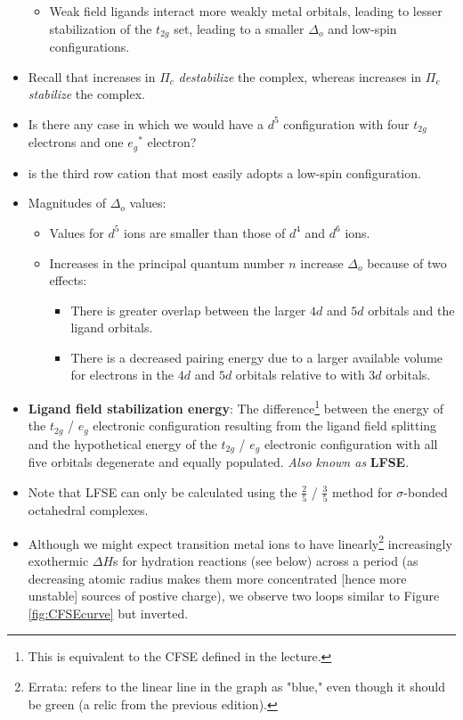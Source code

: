 \documentclass[../notes.tex]{subfiles}
\begin{document}
\begin{itemize}
    \begin{itemize}
        \item Weak field ligands interact more weakly metal orbitals, leading to lesser stabilization of the $t_{2g}$ set, leading to a smaller $\Delta_o$ and low-spin configurations.
    \end{itemize}
    \item Recall that increases in $\Pi_c$ \emph{destabilize} the complex, whereas increases in $\Pi_e$ \emph{stabilize} the complex.
    \item Is there any case in which we would have a $d^5$ configuration with four $t_{2g}$ electrons and one ${e_g}^*$ electron?
    \item {} is the third row cation that most easily adopts a low-spin configuration.
    \item Magnitudes of $\Delta_o$ values:
    \begin{itemize}
        \item Values for $d^5$ ions are smaller than those of $d^4$ and $d^6$ ions.
        \item Increases in the principal quantum number $n$ increase $\Delta_o$ because of two effects:
        \begin{itemize}
            \item There is greater overlap between the larger $4d$ and $5d$ orbitals and the ligand orbitals.
            \item There is a decreased pairing energy due to a larger available volume for electrons in the $4d$ and $5d$ orbitals relative to with $3d$ orbitals.
        \end{itemize}
    \end{itemize}
    \item \textbf{Ligand field stabilization energy}: The difference\footnote{This is equivalent to the CFSE defined in the lecture.} between the energy of the $t_{2g}$ / $e_g$ electronic configuration resulting from the ligand field splitting and the hypothetical energy of the $t_{2g}$ / $e_g$ electronic configuration with all five orbitals degenerate and equally populated. \emph{Also known as} \textbf{LFSE}.
    \item Note that LFSE can only be calculated using the $\frac{2}{5}$ / $\frac{3}{5}$ method for $\sigma$-bonded octahedral complexes.
    \item Although we might expect transition metal ions to have linearly\footnote{Errata: \textcite{bib:MiesslerFischerTarr} refers to the linear line in the graph as "blue," even though it should be green (a relic from the previous edition).} increasingly exothermic $\Delta H$s for hydration reactions (see below) across a period (as decreasing atomic radius makes them more concentrated [hence more unstable] sources of postive charge), we observe two loops similar to Figure \ref{fig:CFSEcurve} but inverted.

\end{itemize}
\end{document}
